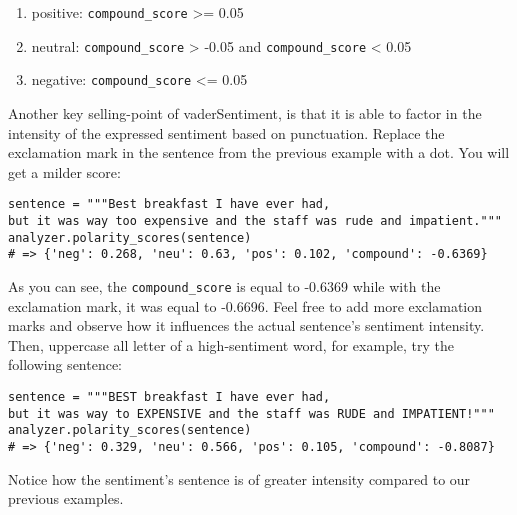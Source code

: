 	\begin{enumerate}
		\item [] positive: \verb|compound_score| >= 0.05
		\item [] neutral: \verb|compound_score| > -0.05 and \verb|compound_score| < 0.05
		\item [] negative: \verb|compound_score| <= 0.05
	\end{enumerate}

	Another key selling-point of vaderSentiment, is that it is able to factor in the intensity of the expressed sentiment based on punctuation. Replace the exclamation mark in the sentence from the previous example with a dot. You will get a milder score:
	\begin{verbatim}
sentence = """Best breakfast I have ever had, 
but it was way too expensive and the staff was rude and impatient."""
analyzer.polarity_scores(sentence)
# => {'neg': 0.268, 'neu': 0.63, 'pos': 0.102, 'compound': -0.6369}
	\end{verbatim}
	As you can see, the \verb|compound_score| is equal to -0.6369 while with the exclamation mark, it was equal to -0.6696. Feel free to add more exclamation marks and observe how it influences the actual sentence's sentiment intensity. Then, uppercase all letter of a high-sentiment word, for example, try the following sentence: 
	\begin{Verbatim}
sentence = """BEST breakfast I have ever had, 
but it was way to EXPENSIVE and the staff was RUDE and IMPATIENT!"""
analyzer.polarity_scores(sentence)
# => {'neg': 0.329, 'neu': 0.566, 'pos': 0.105, 'compound': -0.8087}
	\end{Verbatim}
	Notice how the sentiment's sentence is of greater intensity compared to our previous examples.
	
